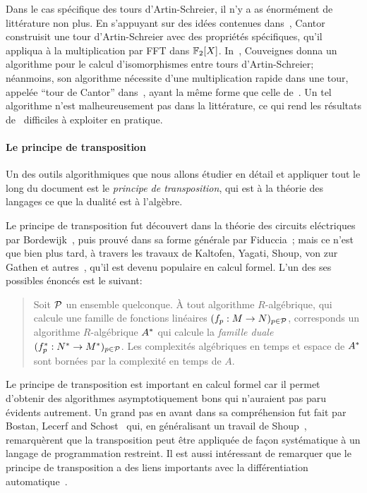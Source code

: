 Dans le cas spécifique des tours d'Artin-Schreier, il n'y a as
énormément de littérature non plus. En s'appuyant sur des idées
contenues dans~\cite{Conway:ONAG2000}, Cantor~\cite{cantor89}
construisit une tour d'Artin-Schreier avec des propriétés spécifiques,
qu'il appliqua à la multiplication par FFT dans
$\mathbb{F}_2[X]$. In~\cite{couveignes00}, Couveignes donna un algorithme pour
le calcul d'isomorphismes entre tours d'Artin-Schreier; néanmoins, son
algorithme nécessite d'une multiplication rapide dans une tour,
appelée ``tour de Cantor'' dans~\cite{couveignes00}, ayant la même
forme que celle de~\cite{cantor89}. Un tel algorithme n'est
malheureusement pas dans la littérature, ce qui rend les résultats
de~\cite{couveignes00} difficiles à exploiter en pratique.

\paragraph*{Le principe de transposition}
Un des outils algorithmiques que nous allons étudier en détail et
appliquer tout le long du document est le \emph{principe de
  transposition}, qui est à la théorie des langages ce que la dualité
est à l'algèbre.

Le principe de transposition fut découvert dans la théorie des
circuits eléctriques par Bordewijk~\cite{bordewijk57}, puis prouvé
dans sa forme générale par Fiduccia~\cite{fiduccia:phd}; mais ce n'est
que bien plus tard, à travers les travaux de Kaltofen, Yagati, Shoup,
von zur Gathen et
autres~\cite{kaltofen+lakshman89,vzgathen+shoup92,shoup94,shoup95,shoup99,hanrot+quercia+zimmermann},
qu'il est devenu populaire en calcul formel. L'un des ses possibles
énoncés est le suivant:
\begin{quote}
  Soit $\mathcal{P}$ un ensemble quelconque. À tout algorithme
  $R$-algébrique, qui calcule une famille de fonctions linéaires
  $(f_p:M\rightarrow N)_{p\in\mathcal{P}}$, corresponds un algorithme
  $R$-algébrique $A^\ast$ qui calcule la \emph{famille duale}
  $(f^\ast_p:N^\ast\rightarrow M^\ast)_{p\in\mathcal{P}}$. Les complexités
  algébriques en temps et espace de $A^\ast$ sont bornées par la
  complexité en temps de $A$.
\end{quote}

Le principe de transposition est important en calcul formel car il
permet d'obtenir des algorithmes asymptotiquement bons qui n'auraient
pas paru évidents autrement. Un grand pas en avant dans sa
compréhension fut fait par Bostan, Lecerf and
Schost~\cite{bostan+lecerf+schost:tellegen} qui, en généralisant un
travail de Shoup~\cite{shoup95}, remarquèrent que la transposition
peut être appliquée de façon systématique à un langage de
programmation restreint. Il est aussi intéressant de remarquer que le
principe de transposition a des liens importants avec la
différentiation automatique~\cite{baur+strassen83,kaltofen+lakshman89,Ka2K,gashkov+gashkov05,sergeev08}.

